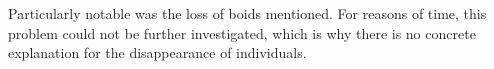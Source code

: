 \documentclass[a4paper, 10pt, journal]{wissarbIEEE}      %
\begin{document}





Particularly notable was the loss of boids mentioned. For reasons of time, this problem could not be further investigated, which is why there is no concrete explanation for the disappearance of individuals.


\end{document}
